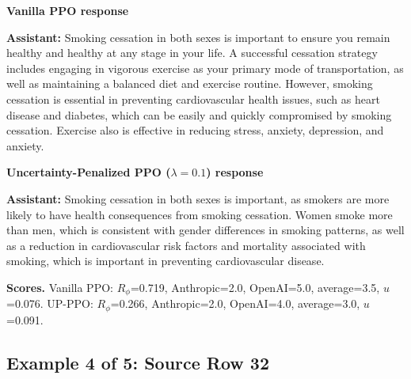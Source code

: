 \documentclass[11pt]{article}
\newcommand{\Rphi}{R_{\phi}}
\begin{document}
\begin{tcolorbox}[enhanced,breakable,colback=SoftRed,colframe=black!45,boxrule=0.35pt,arc=1.2mm,left=3pt,right=3pt,top=3pt,bottom=3pt,before skip=4pt,after skip=5pt]
\textbf{Vanilla PPO response}\par\smallskip
\textbf{Assistant:} Smoking cessation in both sexes is important to ensure you remain healthy and healthy at any stage in your life. A successful cessation strategy includes engaging in vigorous exercise as your primary mode of transportation, as well as maintaining a balanced diet and exercise routine. However, smoking cessation is essential in preventing cardiovascular health issues, such as heart disease and diabetes, which can be easily and quickly compromised by smoking cessation. Exercise also is effective in reducing stress, anxiety, depression, and anxiety.
\end{tcolorbox}


\begin{tcolorbox}[enhanced,breakable,colback=SoftBlue,colframe=black!45,boxrule=0.35pt,arc=1.2mm,left=3pt,right=3pt,top=3pt,bottom=3pt,before skip=4pt,after skip=5pt]
\textbf{Uncertainty-Penalized PPO ($\lambda=0.1$) response}\par\smallskip
\textbf{Assistant:} Smoking cessation in both sexes is important, as smokers are more likely to have health consequences from smoking cessation. Women smoke more than men, which is consistent with gender differences in smoking patterns, as well as a reduction in cardiovascular risk factors and mortality associated with smoking, which is important in preventing cardiovascular disease.
\end{tcolorbox}


\begin{tcolorbox}[enhanced,breakable,colback=white,colframe=black!35,boxrule=0.25pt,arc=1.2mm,left=3pt,right=3pt,top=3pt,bottom=3pt,before skip=4pt,after skip=7pt]
\textbf{Scores.} Vanilla PPO: $\Rphi$=0.719, Anthropic=2.0, OpenAI=5.0, average=3.5, $u$=0.076. UP-PPO: $\Rphi$=0.266, Anthropic=2.0, OpenAI=4.0, average=3.0, $u$=0.091.
\end{tcolorbox}


\subsection*{Example 4 of 5: Source Row 32}
\end{document}
